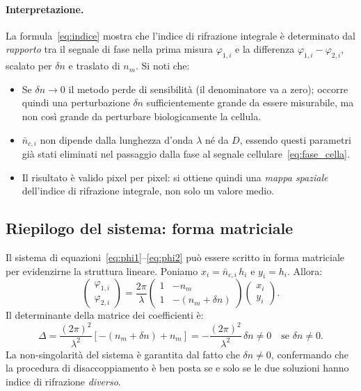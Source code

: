 \paragraph{Interpretazione.}
La formula~\eqref{eq:indice} mostra che l'indice di rifrazione integrale è
determinato dal \emph{rapporto} tra il segnale di fase nella prima misura
$\varphi_{1,i}$ e la differenza $\varphi_{1,i} - \varphi_{2,i}$, scalato per
$\delta n$ e traslato di $n_m$. Si noti che:
\begin{itemize}
  \item Se $\delta n \to 0$ il metodo perde di sensibilità (il denominatore va
        a zero); occorre quindi una perturbazione $\delta n$ sufficientemente
        grande da essere misurabile, ma non così grande da perturbare
        biologicamente la cellula.
  \item $\bar{n}_{c,i}$ non dipende dalla lunghezza d'onda $\lambda$ né da $D$,
        essendo questi parametri già stati eliminati nel passaggio dalla fase al
        segnale cellulare~\eqref{eq:fase_cella}.
  \item Il risultato è valido pixel per pixel: si ottiene quindi una
        \emph{mappa spaziale} dell'indice di rifrazione integrale, non solo un
        valore medio.
\end{itemize}

\subsection{Riepilogo del sistema: forma matriciale}
\label{subsec:matriciale}

Il sistema di equazioni~\eqref{eq:phi1}--\eqref{eq:phi2} può essere scritto in
forma matriciale per evidenzirne la struttura lineare. Poniamo
$x_i = \bar{n}_{c,i}\,h_i$ e $y_i = h_i$. Allora:
\[
\begin{pmatrix} \varphi_{1,i} \\ \varphi_{2,i} \end{pmatrix}
= \frac{2\pi}{\lambda}
\begin{pmatrix} 1 & -n_m \\ 1 & -(n_m+\delta n) \end{pmatrix}
\begin{pmatrix} x_i \\ y_i \end{pmatrix}.
\]
Il determinante della matrice dei coefficienti è:
\[
  \Delta = \frac{(2\pi)^2}{\lambda^2}
  \left[-(n_m+\delta n) + n_m\right]
  = -\frac{(2\pi)^2}{\lambda^2}\,\delta n \neq 0
  \quad \text{se } \delta n \neq 0.
\]
La non-singolarità del sistema è garantita dal fatto che $\delta n \neq 0$,
confermando che la procedura di disaccoppiamento è ben posta se e solo se le due
soluzioni hanno indice di rifrazione \emph{diverso}.

